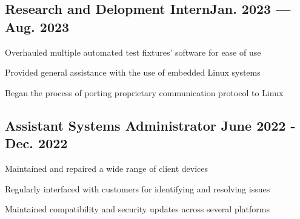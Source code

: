 \subsection{{Research and Delopment Intern\hfill Jan. 2023 --- Aug. 2023}}
\begin{zitemize}
\item Overhauled multiple automated test fixtures' software for ease of use
\item Provided general assistance with the use of embedded Linux systems
\item Began the process of porting proprietary communication protocol to Linux
\end{zitemize}

\subsection{{Assistant Systems Administrator \hfill June 2022 - Dec. 2022}}
\begin{zitemize}
\item Maintained and repaired a wide range of client devices
\item Regularly interfaced with customers for identifying and resolving issues
\item Maintained compatibility and security updates across several platforms
\end{zitemize}

